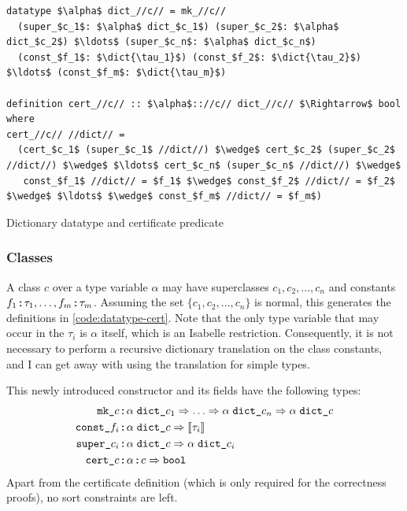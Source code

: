 \begin{code}[t]
  \begin{lstlisting}
datatype $\alpha$ dict_//c// = mk_//c//
  (super_$c_1$: $\alpha$ dict_$c_1$) (super_$c_2$: $\alpha$ dict_$c_2$) $\ldots$ (super_$c_n$: $\alpha$ dict_$c_n$)
  (const_$f_1$: $\dict{\tau_1}$) (const_$f_2$: $\dict{\tau_2}$) $\ldots$ (const_$f_m$: $\dict{\tau_m}$)

definition cert_//c// :: $\alpha$:://c// dict_//c// $\Rightarrow$ bool where
cert_//c// //dict// =
  (cert_$c_1$ (super_$c_1$ //dict//) $\wedge$ cert_$c_2$ (super_$c_2$ //dict//) $\wedge$ $\ldots$ cert_$c_n$ (super_$c_n$ //dict//) $\wedge$
   const_$f_1$ //dict// = $f_1$ $\wedge$ const_$f_2$ //dict// = $f_2$ $\wedge$ $\ldots$ $\wedge$ const_$f_m$ //dict// = $f_m$)
  \end{lstlisting}
  \caption{Dictionary datatype and certificate predicate}
  \label{code:datatype-cert}
\end{code}

\subsubsection{Classes}

A class $c$ over a type variable $\alpha$ may have superclasses $c_1, c_2, \ldots, c_n$ and constants $f_1 \mathbin{:\!\!:} \tau_1, \ldots, f_m \mathbin{:\!\!:} \tau_m$.
Assuming the set $\{ c_1, c_2, \ldots, c_n\}$ is normal, this generates the definitions in \cref{code:datatype-cert}.
Note that the only type variable that may occur in the $\tau_i$ is $\alpha$ itself, which is an Isabelle restriction.
Consequently, it is not necessary to perform a recursive dictionary translation on the class constants, and I can get away with using the translation for simple types.

This newly introduced constructor and its fields have the following types:
\begin{align*}
  \holconst{mk\_}c &\holdoublecolon \alpha\;\holconst{dict\_}c_1 \Rightarrow \ldots \Rightarrow \alpha\;\holconst{dict\_}c_n \Rightarrow \alpha\;\holconst{dict\_}c \\
  \holconst{const\_}f_i &\holdoublecolon \alpha\;\holconst{dict\_}c \Rightarrow \dict{\tau_i} \\
  \holconst{super\_}c_i &\holdoublecolon \alpha\;\holconst{dict\_}c \Rightarrow \alpha\;\holconst{dict\_}c_i \\
  \holconst{cert\_}c &\holdoublecolon \holtypejudgement{\alpha}{c} \Rightarrow \holtype{bool}
\end{align*}
Apart from the certificate definition (which is only required for the correctness proofs), no sort constraints are left.

